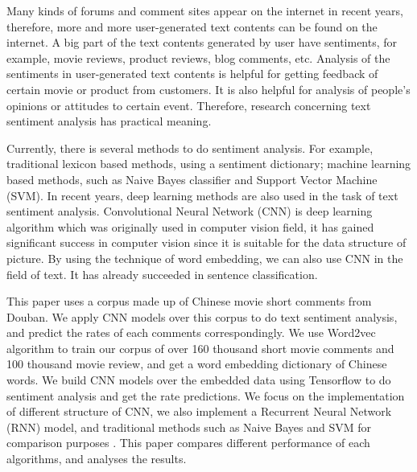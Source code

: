 \begin{enabstract}
Many kinds of forums and comment sites appear on the internet in recent years, therefore, more and more user-generated text contents can be found on the internet. A big part of the text contents generated by user have sentiments, for example, movie reviews, product reviews, blog comments, etc. Analysis of the sentiments in user-generated text contents is helpful for getting feedback of certain movie or product from customers. It is also helpful for analysis of people's opinions or attitudes to certain event. Therefore, research concerning text sentiment analysis has practical meaning.

Currently, there is several methods to do sentiment analysis. For example, traditional lexicon based methods, using a sentiment dictionary; machine learning based methods, such as Naive Bayes classifier and Support Vector Machine (SVM). In recent years, deep learning methods are also used in the task of text sentiment analysis. Convolutional Neural Network (CNN) is deep learning algorithm which was originally used in computer vision field, it has gained significant success in computer vision since it is suitable for the data structure of picture. By using the technique of word embedding, we can also use CNN in the field of text. It has already succeeded in sentence classification.

This paper uses a corpus made up of Chinese movie short comments from Douban. We apply CNN models over this corpus to do text sentiment analysis, and predict the rates of each comments correspondingly. We use Word2vec algorithm to train our corpus of over 160 thousand short movie comments and 100 thousand movie review, and get a word embedding dictionary of Chinese words. We build CNN models over the embedded data using Tensorflow to do sentiment analysis and get the rate predictions. We focus on the implementation of different structure of CNN, we also implement a Recurrent Neural Network (RNN) model, and traditional methods such as Naive Bayes and SVM for comparison purposes   . This paper compares different performance of each algorithms, and analyses the results.

\end{enabstract}

